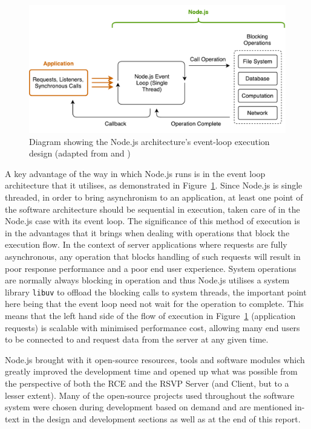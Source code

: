         \begin{figure}[h!]
          \centering
          \includegraphics[width=0.9\linewidth]{figures/softDesign-nodeEventLoop}
          \caption[Diagram showing the Node.js architecture's event-loop execution design]{Diagram showing the Node.js architecture's event-loop execution design (adapted from \cite{fig:softDesign-nodeEventLoop_cite1} and \cite{fig:softDesign-nodeEventLoop_cite2})}
          \label{fig:softDesign-nodeEventLoop}
        \end{figure}
        
        A key advantage of the way in which Node.js runs is in the event loop architecture that it utilises, as demonstrated in Figure~\ref{fig:softDesign-nodeEventLoop}. Since Node.js is single threaded, in order to bring asynchronism to an application, at least one point of the software architecture should be sequential in execution, taken care of in the Node.js case with its event loop. The significance of this method of execution is in the advantages that it brings when dealing with operations that block the execution flow. In the context of server applications where requests are fully asynchronous, any operation that blocks handling of such requests will result in poor response performance and a poor end user experience. System operations are normally always blocking in operation and thus Node.js utilises a system library \texttt{libuv} to offload the blocking calls to system threads, the important point here being that the event loop need not wait for the operation to complete. This means that the left hand side of the flow of execution in Figure~\ref{fig:softDesign-nodeEventLoop} (application requests) is scalable with minimised performance cost, allowing many end users to be connected to and request data from the server at any given time.
        
        Node.js brought with it open-source resources, tools and software modules which greatly improved the development time and opened up what was possible from the perspective of both the RCE and the RSVP Server (and Client, but to a lesser extent). Many of the open-source projects used throughout the software system were chosen during development based on demand and are mentioned in-text in the design and development sections as well as at the end of this report. %
        
